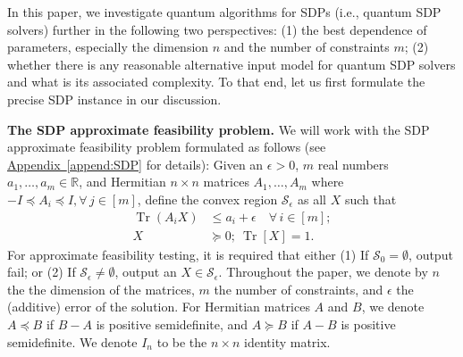 \documentclass[a4paper,UKenglish,cleveref, autoref]{lipics-v2019}
\theoremstyle{remark}
\numberwithin{equation}{section}
\numberwithin{oracle}{section}
\numberwithin{remark}{section}
\newcommand{\append}[1]{\hyperref[append:#1]{Appendix~\ref*{append:#1}}}
\newcommand{\range}[1]{[#1]}
\newcommand{\R}{\ensuremath{\mathbb{R}}}
\DeclareMathOperator{\tr}{Tr}
\DeclareMathOperator{\Tr}{Tr}
\newcommand{\hd}[1]{\vspace{2mm} \noindent \textbf{#1}}
\begin{document}
In this paper, we investigate quantum algorithms for SDPs (i.e., quantum SDP solvers) further in the following two perspectives: (1) the best dependence of parameters, especially the dimension $n$ and the number of constraints $m$; (2) whether there is any reasonable alternative input model for quantum SDP solvers and what is its associated complexity. To that end, let us first formulate the precise SDP instance in our discussion.

\hd{The SDP approximate feasibility problem.} We will work with the SDP approximate feasibility problem formulated as follows  (see \append{SDP} for details): Given an $\epsilon>0$, $m$ real numbers $a_{1},\ldots,a_{m}\in\R$, and Hermitian $n\times n$ matrices $A_{1},\ldots,A_{m}$ where $-I\preceq A_{i}\preceq I,  \forall\,j\in\range{m}$, define the convex region $\mathcal{S}_{\epsilon}$ as all $X$ such that
\begin{align}
\tr(A_i X)&\leq a_{i}+\epsilon\quad\forall\,i\in\range{m};  \label{eqn:SDP}  \\
X&\succeq 0;\ \Tr[X]=1. \nonumber
\end{align}
For approximate feasibility testing, it is required that either (1) If $\mathcal{S}_{0}=\emptyset$, output fail; or (2) If $\mathcal{S}_{\epsilon}\neq\emptyset$, output an $X\in\mathcal{S}_{\epsilon}$. Throughout the paper, we denote by $n$ the the dimension of the matrices, $m$ the number of constraints, and $\epsilon$ the (additive) error of the solution. For Hermitian matrices $A$ and $B$, we denote $A\preceq B$ if $B-A$ is positive semidefinite, and $A\succeq B$ if $A-B$ is positive semidefinite. We denote $I_{n}$ to be the $n\times n$ identity matrix.
\end{document}
